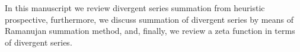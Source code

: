 In this manuscript we review divergent series summation from heuristic prospective, furthermore, we discuss
summation of divergent series by means of Ramanujan summation method, and, finally, we review a zeta function
in terms of divergent series.